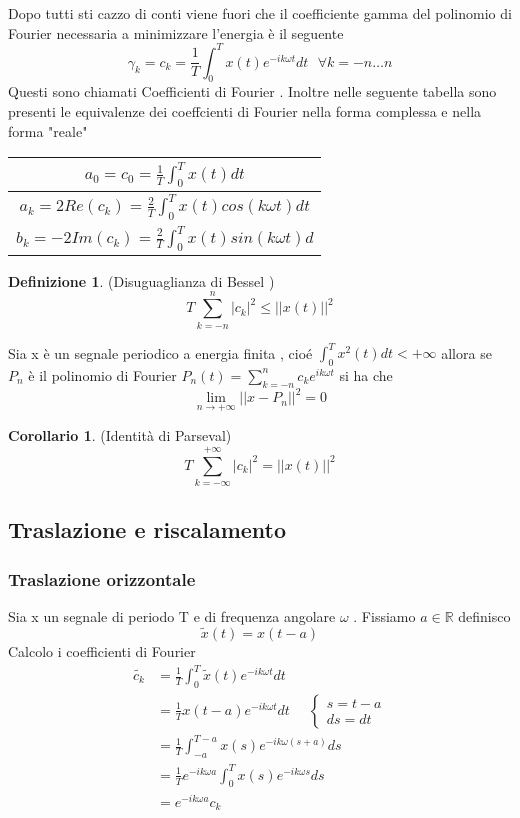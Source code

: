 \documentclass{article}
\theoremstyle{definition}
\newtheorem*{definizione}{Definizione}
\newtheorem*{corollario}{Corollario}
\newcommand{\R}{\mathbb{R}}
\newcommand{\eckm}{e^{-ik\omega t}}
\newcommand{\inT}{\int_{0}^{T} }
\begin{document}
Dopo tutti sti cazzo di conti viene fuori che il coefficiente gamma del polinomio di Fourier necessaria a minimizzare l'energia è il seguente 
$$\gamma_{k}= c_k=\frac{1}{T}\inT x(t) e^{-ik\omega t}dt \ \ \ \forall k=-n \dots n $$
Questi sono chiamati Coefficienti di Fourier . \newpage
Inoltre nelle seguente tabella sono presenti le equivalenze dei coeffcienti di Fourier nella forma complessa e nella forma "reale"  
\begin{center}
\begin{tabular}{||c||}
	\hline
	$a_0=c_0=\frac{1}{T}\inT x(t) dt$
	\rule[-1ex]{0pt}{2.5ex}  \\
	\hline
	$a_k=2Re(c_k)=\frac{2}{T}\inT x(t)cos(k\omega t) dt$
	\rule[-1ex]{0pt}{2.5ex}  \\
	\hline
	$b_k=-2Im(c_k)=\frac{2}{T}\inT x(t)sin(k\omega t) d$
	\rule[-1ex]{0pt}{2.5ex}  \\
	\hline
\end{tabular}
\end{center}
\begin{definizione}(Disuguaglianza di Bessel )
	 $$T\sum_{k=-n}^{n} |c_k|^2\leq ||x(t)||^2$$
\end{definizione}
\begin{teo}{}{}
	Sia x è un segnale periodico a energia finita , cioé $\int_{0}^{T}x^2(t)dt < + \infty $ allora se $P_n$ è il polinomio di Fourier $P_n(t)=\sum_{k=-n}^n c_ke^{ik\omega t}  $ si ha che 
	$$\lim_{n \rightarrow +\infty} ||x-P_n||^2=0$$ 
\end{teo}
\begin{corollario}(Identità di Parseval)
	 $$T\sum_{k=-\infty}^{+\infty} |c_k|^2=||x(t)||^2$$
\end{corollario}
\subsection{Traslazione e riscalamento}
\subsubsection{Traslazione orizzontale}
Sia x un segnale di periodo T e di frequenza angolare $ \omega$ . Fissiamo $ a \in \R$ definisco 
$$\tilde{x}(t)=x(t-a)$$ 
Calcolo i coefficienti di Fourier 
\begin{align*}
\tilde{c_k}&= \frac{1}{T} \int_{0}^{T}\tilde{x}(t)\eckm dt\\
&=\frac{1}{T}x(t-a)\eckm   dt  \ \ \ \ \ \ \begin{cases}
	s=t-a \\
	ds=dt 
\end{cases} \\
&=\frac{1}{T}\int_{-a}^{T-a} x(s)e^{-ik\omega (s+a)}ds\\
&=\frac{1}{T} e^{-ik\omega a } \inT x(s)e^{-ik\omega s}ds\\
&= e^{-ik\omega a } c_k
\end{align*} 
\end{document}
